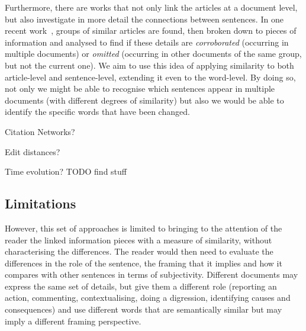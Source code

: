 Furthermore, there are works that not only link the articles at a document level, but also investigate in more detail the connections between sentences.
In one recent work~\cite{bountouridis2018explaining}, groups of similar articles are found, then broken down to pieces of information and analysed to find if these details are \emph{corroborated} (occurring in multiple documents) or \emph{omitted} (occurring in other documents of the same group, but not the current one). 
We aim to use this idea of applying similarity to both article-level and sentence-level, extending it even to the word-level. By doing so,
not only we might be able to recognise which sentences appear in multiple documents (with different degrees of similarity) but also we would be able to identify the specific words that have been changed.




Citation Networks?

Edit distances?

Time evolution? TODO find stuff

\subsection{Limitations}
\label{ssec:lit_relationships_limitations}

However, this set of approaches is limited to bringing to the attention of the reader the linked information pieces with a measure of similarity, without characterising the differences. The reader would then need to evaluate the differences in the role of the sentence, the framing that it implies and how it compares with other sentences in terms of subjectivity.
Different documents may express the same set of details, but give them a different role (reporting an action, commenting, contextualising, doing a digression, identifying causes and consequences) and use different words that are semantically similar but may imply a different framing perspective.







